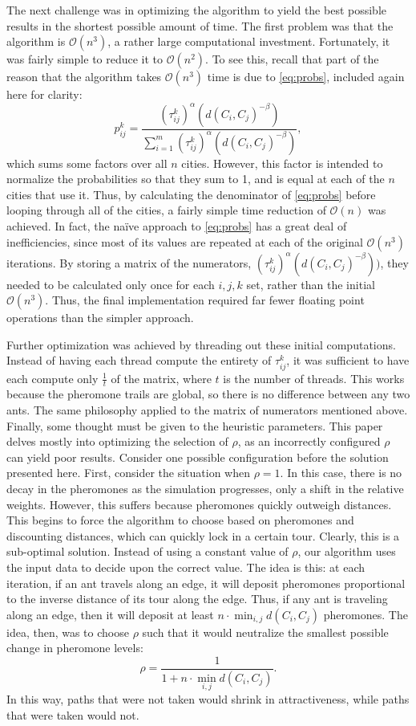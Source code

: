 \documentclass[twocolumn]{article}
\begin{document}
The next challenge was in optimizing the algorithm to yield the best possible
results in the shortest possible amount of time. The first problem was that the
algorithm is $\mathcal{O}(n^3)$, a rather large computational investment. Fortunately,
it was fairly simple to reduce it to $\mathcal{O}(n^2)$. To see this, recall that
part of the reason that 
the algorithm takes $\mathcal{O}(n^3)$ time is due to \eqref{eq:probs}, included again
here for clarity:
\[ p_{ij}^k = \frac{(\tau^k_{ij})^\alpha(d(C_i,C_j)^{-\beta})}{\displaystyle \sum_{i=1}^m 
  (\tau^k_{ij})^\alpha(d(C_i,C_j)^{-\beta})} ,\]
which sums
some factors over all $n$ cities. However, this factor is intended to normalize the
probabilities so that they sum to 1, and is equal at each of the $n$ cities that 
use it. Thus, by calculating the denominator of \eqref{eq:probs} before looping through 
all of the cities, a fairly simple time reduction of $\mathcal{O}(n)$ was achieved. 
In fact, the na\"{i}ve approach to \eqref{eq:probs} has a great deal of inefficiencies,
since most of its values are repeated at each of the original $\mathcal{O}(n^3)$ iterations.
By storing a matrix of the numerators, $(\tau^k_{ij})^\alpha(d(C_i,C_j)^{-\beta}))$, they needed to be
calculated only once for each $i,j,k$ set, rather than the initial $\mathcal{O}(n^3)$. Thus,
the final implementation required far fewer floating point operations than the simpler approach.

Further optimization was achieved by threading out these initial computations. Instead of 
having each thread compute the entirety of $\tau^k_{ij}$, it was sufficient to have each
compute only $\frac{1}{t}$ of the matrix, where $t$ is the number of threads. This works
because the pheromone trails are global, so there is no difference between any two ants.
The same philosophy applied to the matrix of numerators mentioned above. \\

Finally, some thought must be given to the heuristic parameters. This paper delves mostly into 
optimizing the selection of $\rho$, as an incorrectly configured $\rho$ can yield poor
results. Consider one possible configuration before the solution presented here. First,
consider the situation when $\rho = 1$. In this case, there is no decay in the pheromones
as the simulation progresses, only a shift in the relative weights. However, this suffers
because pheromones quickly outweigh distances. This begins to force the algorithm to
choose based on pheromones and discounting distances, which can quickly lock in a certain 
tour. Clearly, this is a sub-optimal solution. Instead of using a constant value of $\rho$,
our algorithm uses the input data to decide upon the correct value. The idea is this: at
each iteration, if an ant travels along an edge, it will deposit 
pheromones proportional to the inverse distance of its tour along the edge. 
Thus, if any ant is traveling along an edge, then it will deposit
at least $n\cdot\min_{i,j} d(C_i,C_j)$ pheromones. The idea, then, was to choose 
$\rho$ such that it would neutralize the smallest possible change in pheromone levels:
\[ \rho = \frac{1}{\displaystyle 1+n\cdot\min_{i,j} d(C_i,C_j)}. \]
In this way, paths that were not taken would shrink in attractiveness, while paths that
were taken would not. 
\end{document}
